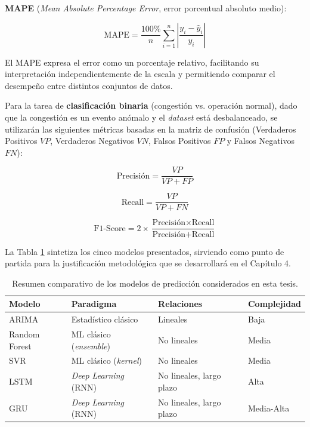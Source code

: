 \documentclass[12pt]{report}
\begin{document}
\textbf{MAPE} (\textit{Mean Absolute Percentage Error}, error porcentual absoluto medio):

\begin{equation}
    \mbox{MAPE} = \frac{100\%}{n}\sum_{i=1}^{n}\left|\frac{y_i - \hat{y}_i}{y_i}\right|
    \label{eq:mape}
\end{equation}

El MAPE expresa el error como un porcentaje relativo, facilitando su interpretación independientemente de la escala y permitiendo comparar el desempeño entre distintos conjuntos de datos.

Para la tarea de \textbf{clasificación binaria} (congestión vs. operación normal), dado que la congestión es un evento anómalo y el \textit{dataset} está desbalanceado, se utilizarán las siguientes métricas basadas en la matriz de confusión (Verdaderos Positivos $VP$, Verdaderos Negativos $VN$, Falsos Positivos $FP$ y Falsos Negativos $FN$):

\begin{equation}
    \mbox{Precisión} = \frac{VP}{VP + FP}
    \label{eq:precision}
\end{equation}

\begin{equation}
    \mbox{Recall} = \frac{VP}{VP + FN}
    \label{eq:recall}
\end{equation}

\begin{equation}
    \mbox{F1-Score} = 2 \times \frac{\mbox{Precisión} \times \mbox{Recall}}{\mbox{Precisión} + \mbox{Recall}}
    \label{eq:f1_score}
\end{equation}

La Tabla \ref{tab:resumen_modelos} sintetiza los cinco modelos presentados, sirviendo como punto de partida para la justificación metodológica que se desarrollará en el Capítulo 4.

\begin{table}[H]
    \centering
    \begin{tabular}{|l|l|l|l|}
        \hline
        \textbf{Modelo} & \textbf{Paradigma} & \textbf{Relaciones} & \textbf{Complejidad} \\
        \hline
        ARIMA & Estadístico clásico & Lineales & Baja \\
        Random Forest & ML clásico (\textit{ensemble}) & No lineales & Media \\
        SVR & ML clásico (\textit{kernel}) & No lineales & Media \\
        LSTM & \textit{Deep Learning} (RNN) & No lineales, largo plazo & Alta \\
        GRU & \textit{Deep Learning} (RNN) & No lineales, largo plazo & Media-Alta \\
        \hline
    \end{tabular}
    \caption{Resumen comparativo de los modelos de predicción considerados en esta tesis.}
    \label{tab:resumen_modelos}
\end{table}
\clearpage
\end{document}
